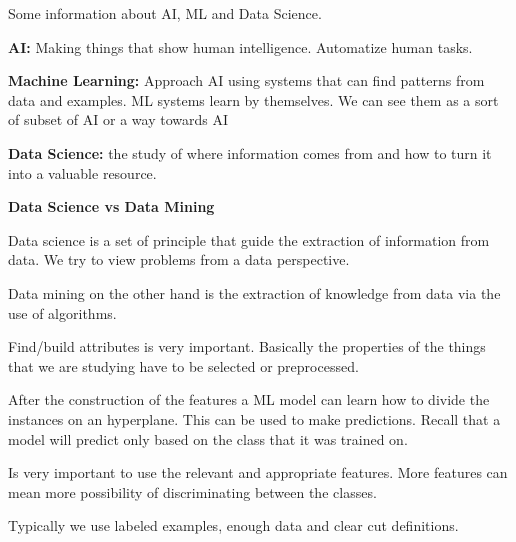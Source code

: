 Some information about AI, ML and Data Science.

\vspace{10pt}


\textbf{AI:} Making things that show human intelligence. Automatize human tasks.

\vspace{10pt}

\textbf{Machine Learning:} Approach AI using systems that can find patterns from data and examples. ML systems learn by themselves. We can see them as a sort of subset of AI or a way towards AI 

\vspace{10pt}

\textbf{Data Science:} the study of where information comes from and how to turn it into a valuable resource.
\vspace{10pt}


\textbf{Data Science vs Data Mining}
\vspace{10pt}

Data science is a set of principle that guide the extraction of information from data. We try to view problems from a data perspective.

\vspace{10pt}

Data mining on the other hand is the extraction of knowledge from data via the use of algorithms.


\vspace{10pt}


Find/build attributes is very important. Basically the properties of the things that we are studying have to be selected or preprocessed.

\vspace{10pt}

After the construction of the features a ML model can learn how to divide the instances on an hyperplane. This can be used to make predictions. Recall that a model will predict only based on the class that it was trained on.

\vspace{10pt}

Is very important to use the relevant and appropriate features. More features can mean more possibility of discriminating between the classes. 

\vspace{10pt} Typically we use labeled examples, enough data and clear cut definitions.

\vspace{10pt}

